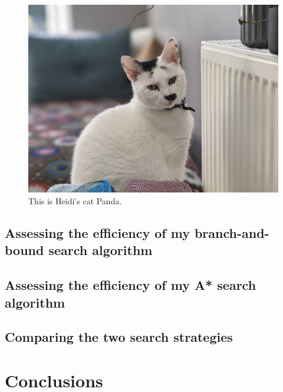 \documentclass[11pt,oneside]{article}
\begin{document}
\begin{figure}[ht]
\centering
  \includegraphics[scale=0.4]{Panda.png}
  \caption{This is Heidi's cat Panda.}
  \label{fig:panda}
 \end{figure} 
 
\subsection{Assessing the efficiency of my branch-and-bound search algorithm}

\subsection{Assessing the efficiency of my A* search algorithm}

\subsection{Comparing the two search strategies}

\section{Conclusions}
\end{document}
